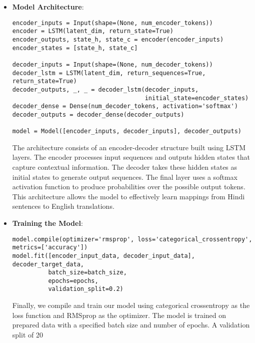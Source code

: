 \documentclass{article}
\begin{document}
\begin{itemize}
    \item \textbf{Model Architecture}:
    \begin{verbatim}
encoder_inputs = Input(shape=(None, num_encoder_tokens))
encoder = LSTM(latent_dim, return_state=True)
encoder_outputs, state_h, state_c = encoder(encoder_inputs)
encoder_states = [state_h, state_c]

decoder_inputs = Input(shape=(None, num_decoder_tokens))
decoder_lstm = LSTM(latent_dim, return_sequences=True, return_state=True)
decoder_outputs, _, _ = decoder_lstm(decoder_inputs,
                                     initial_state=encoder_states)
decoder_dense = Dense(num_decoder_tokens, activation='softmax')
decoder_outputs = decoder_dense(decoder_outputs)

model = Model([encoder_inputs, decoder_inputs], decoder_outputs)
    \end{verbatim}
    
The architecture consists of an encoder-decoder structure built using LSTM layers. The encoder processes input sequences and outputs hidden states that capture contextual information. The decoder takes these hidden states as initial states to generate output sequences. The final layer uses a softmax activation function to produce probabilities over the possible output tokens. This architecture allows the model to effectively learn mappings from Hindi sentences to English translations.



    \item \textbf{Training the Model}:
    \begin{verbatim}
model.compile(optimizer='rmsprop', loss='categorical_crossentropy', metrics=['accuracy'])
model.fit([encoder_input_data, decoder_input_data], decoder_target_data,
          batch_size=batch_size,
          epochs=epochs,
          validation_split=0.2)
    \end{verbatim}
    
Finally, we compile and train our model using categorical crossentropy as the loss function and RMSprop as the optimizer. The model is trained on prepared data with a specified batch size and number of epochs. A validation split of 20%

\end{itemize}
\end{document}
